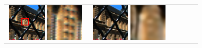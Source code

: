\begin{figure}[ht!]
{\begin{tabular}{cccccc}
\begin{minipage}{0.180\textwidth}
            \centering
            \includegraphics[width=0.46\textwidth, height=0.46\textwidth,cfbox=blue 1pt 0pt]{img/qual/Palais_du_Luxembourg/HR.annotated.png}
            \includegraphics[width=0.46\textwidth, height=0.46\textwidth,cfbox=red 1pt 0pt]{img/qual/Palais_du_Luxembourg/HR.LAM.png}
        \end{minipage} &
        \begin{minipage}{0.180\textwidth}
            \centering
            \includegraphics[width=0.46\textwidth, height=0.46\textwidth,cfbox=blue 1pt 0pt]{img/qual/Palais_du_Luxembourg/IINet/SR.png}
            \includegraphics[width=0.46\textwidth, height=0.46\textwidth,cfbox=red 1pt 0pt]{img/qual/Palais_du_Luxembourg/IINet/SR.LAM.png}

\end{minipage}
\end{tabular}}
\end{figure}
